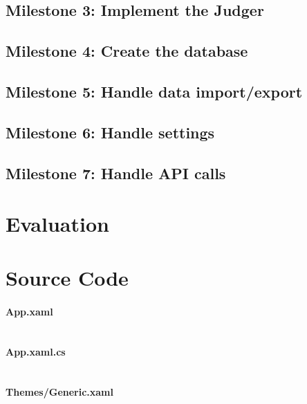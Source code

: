 \documentclass[a4paper]{report}
\begin{document}
\section{Milestone 3: Implement the Judger}

\section{Milestone 4: Create the database}

\section{Milestone 5: Handle data import/export}

\section{Milestone 6: Handle settings}

\section{Milestone 7: Handle API calls}

\chapter{Evaluation}

\chapter{Source Code}

\subsubsection{App.xaml}

\inputminted{xml}{"../src/Algorithm Dynamics/App.xaml"}

\subsubsection{App.xaml.cs}

\inputminted{csharp}{"../src/Algorithm Dynamics/App.xaml.cs"}

\subsubsection{Themes/Generic.xaml}

\inputminted{xml}{"../src/Algorithm Dynamics/Themes/Generic.xaml"}

\printbibliography[
    heading=bibintoc,
    title={Bibliography}
]
\end{document}
